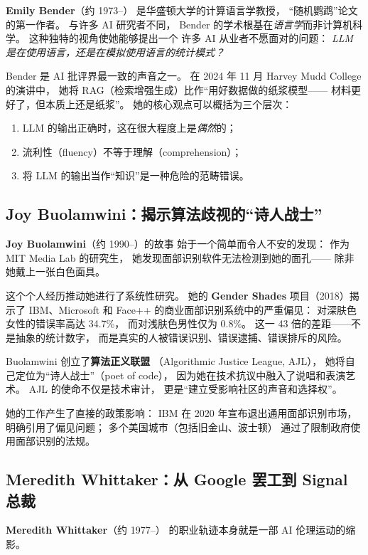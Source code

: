\textbf{Emily Bender}（约 1973--）
是华盛顿大学的计算语言学教授，
``随机鹦鹉''论文的第一作者。
与许多 AI 研究者不同，
Bender 的学术根基在\emph{语言学}而非计算机科学。
这种独特的视角使她能够提出一个
许多 AI 从业者不愿面对的问题：
\emph{LLM 是在使用语言，还是在模拟使用语言的统计模式？}

Bender 是 AI 批评界最一致的声音之一。
在 2024 年 11 月 Harvey Mudd College 的演讲中，
她将 RAG（检索增强生成）比作``用好数据做的纸浆模型——
材料更好了，但本质上还是纸浆''。
她的核心观点可以概括为三个层次：
\begin{enumerate}[noitemsep]
  \item LLM 的输出正确时，这在很大程度上是\emph{偶然}的；
  \item 流利性（fluency）不等于理解（comprehension）；
  \item 将 LLM 的输出当作``知识''是一种危险的范畴错误。
\end{enumerate}

\subsection{Joy Buolamwini：揭示算法歧视的``诗人战士''}

\textbf{Joy Buolamwini}（约 1990--）的故事
始于一个简单而令人不安的发现：
作为 MIT Media Lab 的研究生，
她发现面部识别软件无法检测到她的面孔——
除非她戴上一张白色面具。

这个个人经历推动她进行了系统性研究。
她的 \textbf{Gender Shades} 项目（2018）揭示了
IBM、Microsoft 和 Face++ 的商业面部识别系统中的严重偏见：
对深肤色女性的错误率高达 34.7\%，
而对浅肤色男性仅为 0.8\%。
这一 43 倍的差距——不是抽象的统计数字，
而是真实的人被错误识别、错误逮捕、错误排斥的风险。

Buolamwini 创立了\textbf{算法正义联盟}
（Algorithmic Justice League, AJL），
她将自己定位为``诗人战士''（poet of code），
因为她在技术抗议中融入了说唱和表演艺术。
AJL 的使命不仅是技术审计，
更是``建立受影响社区的声音和选择权''。

她的工作产生了直接的政策影响：
IBM 在 2020 年宣布退出通用面部识别市场，
明确引用了偏见问题；
多个美国城市（包括旧金山、波士顿）
通过了限制政府使用面部识别的法规。

\subsection{Meredith Whittaker：从 Google 罢工到 Signal 总裁}

\textbf{Meredith Whittaker}（约 1977--）
的职业轨迹本身就是一部 AI 伦理运动的缩影。

